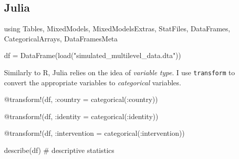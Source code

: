 \documentclass[
  letterpaper,
  DIV=11,
  numbers=noendperiod]{scrreprt}
\newenvironment{Shaded}{\begin{snugshade}}{\end{snugshade}}
\newcommand{\BuiltInTok}[1]{\textcolor[rgb]{0.00,0.23,0.31}{#1}}
\newcommand{\CommentTok}[1]{\textcolor[rgb]{0.37,0.37,0.37}{#1}}
\newcommand{\FunctionTok}[1]{\textcolor[rgb]{0.28,0.35,0.67}{#1}}
\newcommand{\ImportTok}[1]{\textcolor[rgb]{0.00,0.46,0.62}{#1}}
\newcommand{\NormalTok}[1]{\textcolor[rgb]{0.00,0.23,0.31}{#1}}
\newcommand{\OperatorTok}[1]{\textcolor[rgb]{0.37,0.37,0.37}{#1}}
\newcommand{\PreprocessorTok}[1]{\textcolor[rgb]{0.68,0.00,0.00}{#1}}
\newcommand{\StringTok}[1]{\textcolor[rgb]{0.13,0.47,0.30}{#1}}
\begin{document}
\subsection{Julia}

\begin{Shaded}
\begin{Highlighting}[]
\ImportTok{using} \BuiltInTok{Tables}\NormalTok{, }\BuiltInTok{MixedModels}\NormalTok{, }\BuiltInTok{MixedModelsExtras}\NormalTok{, }\BuiltInTok{StatFiles}\NormalTok{, }\BuiltInTok{DataFrames}\NormalTok{, }\BuiltInTok{CategoricalArrays}\NormalTok{, }\BuiltInTok{DataFramesMeta}

\NormalTok{df }\OperatorTok{=} \FunctionTok{DataFrame}\NormalTok{(}\FunctionTok{load}\NormalTok{(}\StringTok{"simulated\_multilevel\_data.dta"}\NormalTok{))}
\end{Highlighting}
\end{Shaded}

Similarly to R, Julia relies on the idea of \emph{variable type}. I use
\texttt{transform} to convert the appropriate variables to
\emph{categorical} variables.

\begin{Shaded}
\begin{Highlighting}[]
\PreprocessorTok{@transform}\NormalTok{!(df, }\OperatorTok{:}\NormalTok{country }\OperatorTok{=} \FunctionTok{categorical}\NormalTok{(}\OperatorTok{:}\NormalTok{country))}

\PreprocessorTok{@transform}\NormalTok{!(df, }\OperatorTok{:}\NormalTok{identity }\OperatorTok{=} \FunctionTok{categorical}\NormalTok{(}\OperatorTok{:}\NormalTok{identity))}

\PreprocessorTok{@transform}\NormalTok{!(df, }\OperatorTok{:}\NormalTok{intervention }\OperatorTok{=} \FunctionTok{categorical}\NormalTok{(}\OperatorTok{:}\NormalTok{intervention))}
\end{Highlighting}
\end{Shaded}

\begin{Shaded}
\begin{Highlighting}[]

\FunctionTok{describe}\NormalTok{(df) }\CommentTok{\# descriptive statistics}
\end{Highlighting}
\end{Shaded}
\end{document}
